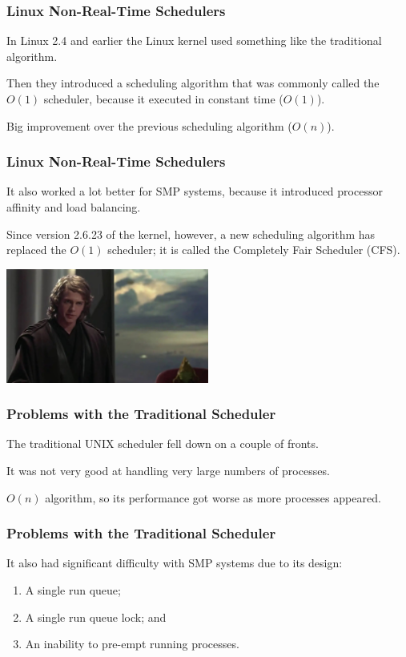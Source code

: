 \begin{frame}
\frametitle{Linux Non-Real-Time Schedulers}

In Linux 2.4 and earlier the Linux kernel used something like the traditional algorithm. 

Then they introduced a scheduling algorithm that was commonly called the $O(1)$ scheduler, because it executed in constant time ($O(1)$). 

Big improvement over the previous scheduling algorithm ($O(n)$).


\end{frame}

\begin{frame}
\frametitle{Linux Non-Real-Time Schedulers}

It also worked a lot better for SMP systems, because it introduced processor affinity and load balancing. 

Since version 2.6.23 of the kernel, however, a new scheduling algorithm has replaced the $O(1)$ scheduler; it is called the \alert{Completely Fair Scheduler} (CFS).

\begin{center}
	\includegraphics[width=0.5\textwidth]{images/rankofmaster.jpg}
\end{center}


\end{frame}

\begin{frame}
\frametitle{Problems with the Traditional Scheduler}

The traditional UNIX scheduler fell down on a couple of fronts. 

It was not very good at handling very large numbers of processes.

$O(n)$ algorithm, so its performance got worse as more processes appeared. 

\end{frame}

\begin{frame}
\frametitle{Problems with the Traditional Scheduler}

It also had significant difficulty with SMP systems due to its design:

\begin{enumerate}
	\item A single run queue;
	\item A single run queue lock; and
	\item An inability to pre-empt running processes.
\end{enumerate}

\end{frame}

